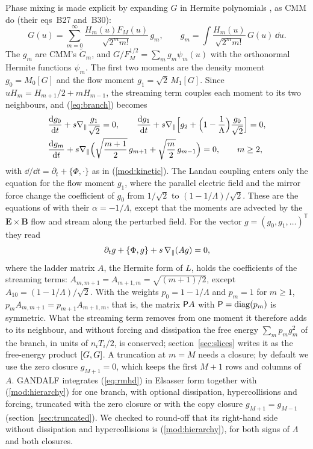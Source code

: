 Phase mixing is made explicit by expanding $G$ in Hermite polynomials \citep{Kanekar2015,Schekochihin2016}, as CMM do (their eqs~B27 and~B30):
\begin{equation}\label{mod:hermiteexp}
  G(u)=\sum_{m=0}^\infty\frac{H_m(u)F_M(u)}{\sqrt{2^mm!}}\,g_m,\qquad
  g_m=\int\frac{H_m(u)}{\sqrt{2^mm!}}\,G(u)\,\dd u .
\end{equation}
The $g_m$ are CMM's $\tilde G_m$, and $G/F_M^{1/2}=\sum_mg_m\psi_m(u)$ with the orthonormal Hermite functions $\psi_m$. The first two moments are the density moment $g_0=M_0[G]$ and the flow moment $g_1=\sqrt2\,M_1[G]$. Since $uH_m=H_{m+1}/2+mH_{m-1}$, the streaming term couples each moment to its two neighbours, and (\ref{eq:branch}) becomes
\begin{equation}\label{mod:hierarchy}
\begin{aligned}
  &\frac{\mathrm{d} g_0}{\mathrm{d} t}+s\nabla_\parallel\frac{g_1}{\sqrt2}=0,\qquad
  \frac{\mathrm{d} g_1}{\mathrm{d} t}+s\nabla_\parallel\Big[g_2+\Big(1-\frac1\Lambda\Big)\frac{g_0}{\sqrt2}\Big]=0,\\
  &\frac{\mathrm{d} g_m}{\mathrm{d} t}+s\nabla_\parallel\Big(\sqrt{\frac{m+1}{2}}\,g_{m+1}+\sqrt{\frac m2}\,g_{m-1}\Big)=0,\qquad m\ge2,
\end{aligned}
\end{equation}
with $\dd/\dd t=\partial_t+\{\Phi,\cdot\}$ as in (\ref{mod:kinetic}). The Landau coupling enters only the equation for the flow moment $g_1$, where the parallel electric field and the mirror force change the coefficient of $g_0$ from $1/\sqrt2$ to $(1-1/\Lambda)/\sqrt2$. These are the equations of \citet[eqs~4.3--4.5]{Kanekar2015} with their $\alpha=-1/\Lambda$, except that the moments are advected by the $\boldsymbol E\times\boldsymbol B$ flow and stream along the perturbed field. For the vector $g=(g_0,g_1,\dots)^{\mathsf T}$ they read
\begin{equation}\label{mod:vector}
  \partial_tg+\{\Phi,g\}+s\,\nabla_\parallel(Ag)=0,
\end{equation}
where the ladder matrix $A$, the Hermite form of $L$, holds the coefficients of the streaming terms: $A_{m,m+1}=A_{m+1,m}=\sqrt{(m+1)/2}$, except $A_{10}=(1-1/\Lambda)/\sqrt2$. With the weights $p_0=1-1/\Lambda$ and $p_m=1$ for $m\ge1$, $p_mA_{m,m+1}=p_{m+1}A_{m+1,m}$, that is, the matrix $\mathsf P A$ with $\mathsf P=\mathrm{diag}(p_m)$ is symmetric. What the streaming term removes from one moment it therefore adds to its neighbour, and without forcing and dissipation the free energy $\sum_mp_mg_m^2$ of the branch, in units of $n_iT_i/2$, is conserved; section~\ref{sec:slices} writes it as the free-energy product $[G,G]$. A truncation at $m=M$ needs a closure; by default we use the zero closure $g_{M+1}=0$, which keeps the first $M+1$ rows and columns of $A$. GANDALF \citep{Kanekar2025} integrates (\ref{eq:rmhd}) in Elsasser form together with (\ref{mod:hierarchy}) for one branch, with optional dissipation, hypercollisions and forcing, truncated with the zero closure or with the copy closure $g_{M+1}=g_{M-1}$ (section~\ref{sec:truncated}). We checked to round-off that its right-hand side without dissipation and hypercollisions is (\ref{mod:hierarchy}), for both signs of $\Lambda$ and both closures.

